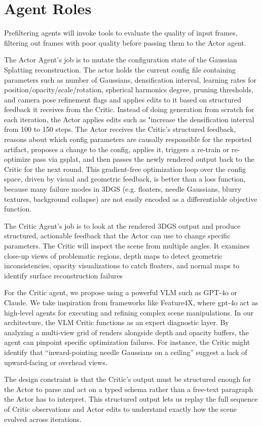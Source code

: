 \section{Agent Roles}
\label{sec:agent_roles}

Prefiltering agents will invoke tools to evaluate the quality of input frames, filtering out frames with poor quality before passing them to the Actor agent.

The Actor Agent's job is to mutate the configuration state of the Gaussian Splatting reconstruction. The actor holds the current config file containing parameters such as number of Gaussians, densification interval, learning rates for position/opacity/scale/rotation, spherical harmonics degree, pruning thresholds, and camera pose refinement flags and applies edits to it based on structured feedback it receives from the Critic. Instead of doing generation from scratch for each iteration, the Actor applies edits such as "increase the densification interval from 100 to 150 steps. The Actor receives the Critic's structured feedback, reasons about which config parameters are causally responsible for the reported artifact, proposes a change to the config, applies it, triggers a re-train or re-optimize pass via gsplat, and then passes the newly rendered output back to the Critic for the next round. This gradient-free optimization loop over the config space, driven by visual and geometric feedback, is better than a loss function, because many failure modes in 3DGS (e.g. floaters, needle Gaussians, blurry textures, background collapse) are not easily encoded as a differentiable objective function.

The Critic Agent's job is to look at the rendered 3DGS output and produce structured, actionable feedback that the Actor can use to change specific parameters. The Critic will inspect the scene from multiple angles. It examines close-up views of problematic regions, depth maps to detect geometric inconsistencies, opacity visualizations to catch floaters, and normal maps to identify surface reconstruction failures

For the Critic agent, we propose using a powerful VLM such as GPT-4o or Claude. We take inspiration from frameworks like Feature4X, where gpt-4o act as high-level agents for executing and refining complex scene manipulations. In our architecture, the VLM Critic functions as an expert diagnostic layer. By analyzing a multi-view grid of renders alongside depth and opacity buffers, the agent can pinpoint specific optimization failures. For instance, the Critic might identify that “inward-pointing needle Gaussians on a ceiling” suggest a lack of upward-facing or overhead views.

The design constraint is that the Critic's output must be structured enough for the Actor to parse and act on a typed schema rather than a free-text paragraph the Actor has to interpret. This structured output lets us replay the full sequence of Critic observations and Actor edits to understand exactly how the scene evolved across iterations.